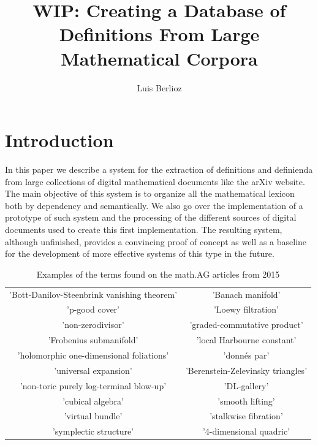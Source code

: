 \documentclass[a4paper]{easychair}
\author{Luis Berlioz}
\title{WIP: Creating a Database of Definitions From Large Mathematical Corpora}
\begin{document}
\maketitle
\begin{abstract}
   
\end{abstract}
\section{Introduction}
In this paper we describe a system for the extraction of definitions and definienda from large collections of digital mathematical documents like the arXiv website. The main objective of this system is to organize all the mathematical lexicon both by dependency and semantically.  We also go over the implementation of a prototype of such system and the processing of the different sources of digital documents used to create this first implementation. The resulting system, although unfinished, provides a convincing proof  of concept as well as a baseline for the development of more effective systems of this type in the future.

\begin{table}[h]
    \sffamily
    \centering
    \begin{tabular}{cc}
        'Bott-Danilov-Steenbrink vanishing theorem' &

        'Banach manifold' \\

 'p-good cover'&

        'Loewy filtration' \\

 'non-zerodivisor'&

 'graded-commutative product'\\

        'Frobenius submanifold' &

 'local Harbourne constant'\\

        'holomorphic one-dimensional foliations' &

 'donnés par'\\

        'universal expansion' &

 'Berenstein-Zelevinsky triangles'\\

        'non-toric purely log-terminal blow-up' &

 'DL-gallery'\\

        'cubical algebra' &

 'smooth lifting'\\

        'virtual bundle' &

 'stalkwise fibration'\\

        'symplectic structure' &

 '4-dimensional quadric'\\
    \end{tabular}
    \caption{\label{sample}Examples of the terms found on the math.AG articles from 2015}
\end{table}
\end{document}
